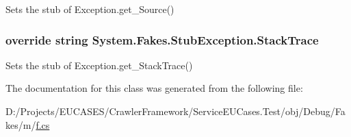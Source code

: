 Sets the stub of Exception.\-get\-\_\-\-Source()

\hypertarget{class_system_1_1_fakes_1_1_stub_exception_abbf680a4f918e2a0e68bd82632f0d09e}{
\subsubsection[{Stack\-Trace}]{\setlength{\rightskip}{0pt plus 5cm}override string System.\-Fakes.\-Stub\-Exception.\-Stack\-Trace\hspace{0.3cm}{\ttfamily [get]}}}\label{class_system_1_1_fakes_1_1_stub_exception_abbf680a4f918e2a0e68bd82632f0d09e}


Sets the stub of Exception.\-get\-\_\-\-Stack\-Trace()



The documentation for this class was generated from the following file\-:\begin{DoxyCompactItemize}
\item 
D\-:/\-Projects/\-E\-U\-C\-A\-S\-E\-S/\-Crawler\-Framework/\-Service\-E\-U\-Cases.\-Test/obj/\-Debug/\-Fakes/m/\hyperlink{m_2f_8cs}{f.\-cs}\end{DoxyCompactItemize}
